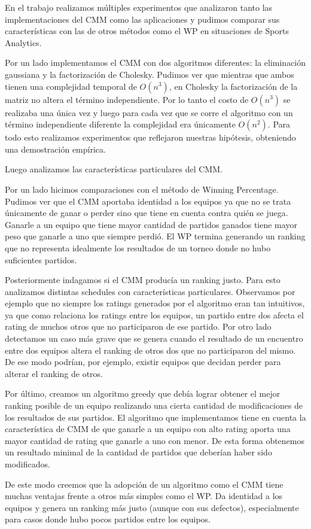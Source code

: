 En el trabajo realizamos m\'ultiples experimentos que analizaron tanto las implementaciones del CMM como las aplicaciones y pudimos comparar sus caracter\'isticas con las de otros m\'etodos como el WP en situaciones de Sports Analytics.

Por un lado implementamos el CMM con dos algoritmos diferentes: la eliminaci\'on gaussiana y la factorizaci\'on de Cholesky. Pudimos ver que mientras que ambos tienen una complejidad temporal de $O(n^{3})$, en Cholesky la factorizaci\'on de la matriz no altera el t\'ermino independiente. Por lo tanto el costo de $O(n^{3})$ se realizaba una \'unica vez y luego para cada vez que se corre el algoritmo con un t\'ermino independiente diferente la complejidad era \'unicamente $O(n^{2})$. Para todo esto realizamos experimentos que reflejaron nuestras hip\'otesis, obteniendo una demostraci\'on emp\'irica.

Luego analizamos las caracter\'isticas particulares del CMM.

Por un lado hicimos comparaciones con el m\'etodo de Winning Percentage. Pudimos ver que el CMM aportaba identidad a los equipos ya que no se trata \'unicamente de ganar o perder sino que tiene en cuenta contra qui\'en se juega. Ganarle a un equipo que tiene mayor cantidad de partidos ganados tiene mayor peso que ganarle a uno que siempre perdi\'o. El WP termina generando un ranking que no representa idealmente los resultados de un torneo donde no hubo suficientes partidos.

Posteriormente indagamos si el CMM produc\'ia un ranking justo. Para esto analizamos distintas schedules con caracter\'isticas particulares. Observamos por ejemplo que no siempre los ratings generados por el algoritmo eran tan intuitivos, ya que como relaciona los ratings entre los equipos, un partido entre dos afecta el rating de muchos otros que no participaron de ese partido. Por otro lado detectamos un caso m\'as grave que se genera cuando el resultado de un encuentro entre dos equipos altera el ranking de otros dos que no participaron del mismo. De ese modo podr\'ian, por ejemplo, existir equipos que decidan perder para alterar el ranking de otros.

Por \'ultimo, creamos un algoritmo greedy que deb\'ia lograr obtener el mejor ranking posible de un equipo realizando una cierta cantidad de modificaciones de los resultados de sus partidos. El algoritmo que implementamos tiene en cuenta la caracter\'istica de CMM de que ganarle a un equipo con alto rating aporta una mayor cantidad de rating que ganarle a uno con menor. De esta forma obtenemos un resultado minimal de la cantidad de partidos que deber\'ian haber sido modificados.

De este modo creemos que la adopci\'on de un algoritmo como el CMM tiene muchas ventajas frente a otros m\'as simples como el WP. Da identidad a los equipos y genera un ranking m\'as justo (aunque con sus defectos), especialmente para casos donde hubo pocos partidos entre los equipos.